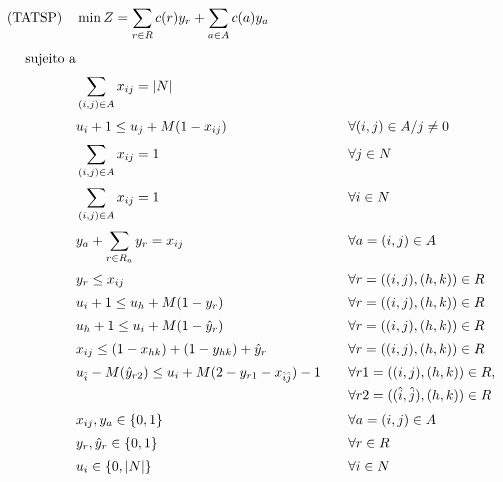 \vspace{-2em}
\begin{align}
    \text{(TATSP)} \quad & \min Z = \sum_{r \in R} c(r)y_r + \sum_{a \in A} c(a)y_a \label{eq:funcao_objetivo} \\[4pt]
    \text{sujeito a} \notag \\[2pt]
    & \sum_{(i,j) \in A} x_{ij} = |N| & \quad & \label{eq:C1} \\[2pt]
    & u_i + 1 \leq u_j + M(1 - x_{ij}) & \quad & \forall (i,j) \in A/j \neq 0 \label{eq:C2}  \\[2pt]
    & \sum_{(i,j) \in A} x_{ij} = 1 & \quad & \forall j \in N \label{eq:C3} \\[2pt]
    & \sum_{(i,j) \in A} x_{ij} = 1 & \quad & \forall i \in N \label{eq:C4} \\[2pt]
    & y_a + \sum_{r \in R_a} y_r = x_{ij} & \quad & \forall a = (i,j) \in A \label{eq:C5} \\[2pt]
    & y_r \leq x_{ij} & \quad & \forall r=((i,j), (h,k)) \in R \label{eq:C6} \\[2pt]
    & u_i + 1 \leq u_h + M(1 - y_r) & \quad & \forall r=((i,j), (h,k)) \in R \label{eq:C7} \\[2pt]
    & u_h + 1 \leq u_i + M(1 - \hat{y}_{r}) & \quad & \forall r=((i,j), (h,k)) \in R  \label{eq:C8} \\[2pt]
    & x_{ij} \leq (1 - x_{hk}) + (1 - y_{hk}) + \hat{y}_{r} & \quad & \forall r=((i,j), (h,k)) \in R \label{eq:C9} \\[2pt]
    & u_{\hat{i}} - M(\hat{y}_{r2}) \leq u_i + M(2 - y_{r1} - x_{\hat{i}\hat{j}}) - 1 & \quad &
    \begin{aligned}[t]
        & \forall r1=((i,j), (h,k)) \in R, \\
        & \forall r2=((\hat{i},\hat{j}), (h,k)) \in R
    \end{aligned} \label{eq:C10} \\[2pt]
    & x_{ij}, y_a \in \{0, 1\} & \quad & \forall a=(i,j) \in A \label{eq:C11} \\[2pt]
    & y_r, \hat{y}_{r} \in \{0,1\} & \quad & \forall r \in R \label{eq:C12} \\[2pt]
    & u_i \in \{0,|N|\} & \quad & \forall i \in N \label{eq:C13}
\end{align}

